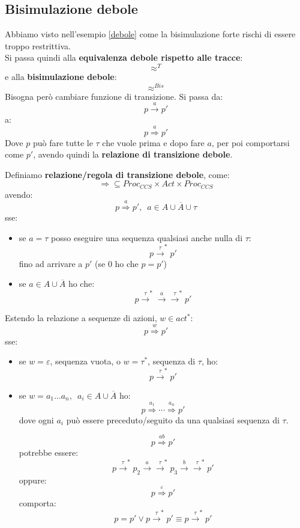 \documentclass[a4paper,12pt, oneside]{book}
\begin{document}
\subsection{Bisimulazione debole}
Abbiamo visto nell'esempio \ref{debole} come la bisimulazione forte rischi di
essere troppo restrittiva.\\
Si passa quindi alla \textbf{equivalenza debole rispetto alle tracce}:
\[\approx^{T}\]
e alla \textbf{bisimulazione debole}:
\[\approx^{Bis}\]
Bisogna però cambiare funzione di transizione. Si passa da:
\[p\stackrel{a}{\rightarrow}p'\]
a:
\[p\stackrel{a}{\Rightarrow}p'\]
Dove $p$ può fare tutte le $\tau$ che vuole prima e dopo fare $a$, per poi
comportarsi come $p'$, avendo quindi la \textbf{relazione di transizione debole}.
\begin{definizione}
  Definiamo \textbf{relazione/regola di transizione debole}, come:
  \[\Rightarrow\subseteq Proc_{CCS}\times Act\times Proc_{CCS}\]
  avendo:
  \[p\stackrel{a}{\Rightarrow}p',\,\,\,a\in A\cup \overline{A}\cup \tau\]
  sse:
  \begin{itemize}
    \item se $a=\tau$ posso eseguire una sequenza qualsiasi anche nulla di
    $\tau$:
    \[p\stackrel{\tau}{\rightarrow}^*p'\]
    fino ad arrivare a $p'$ (se 0 ho che $p=p'$)
    \item se $a\in A\cup\overline{A}$ ho che:
    \[p\stackrel{\tau}{\rightarrow}^*
      \stackrel{a}{\rightarrow}\stackrel{\tau}{\rightarrow}^*p'\]
  \end{itemize}
  Estendo la relazione a sequenze di azioni, $w\in act^*$:
  \[p\stackrel{w}{\Rightarrow}p'\]
  sse:
  \begin{itemize}
    \item se $w=\varepsilon$, sequenza vuota, o $w=\tau^*$, sequenza di $\tau$,
    ho: 
    \[p\stackrel{\tau}{\rightarrow}^*p'\]
    
    \item se $w=a_1\ldots a_n,\,\,\,a_i\in A\cup \overline{A}$ ho:
    \[p\stackrel{a_1}{\Rightarrow}\cdots \stackrel{a_n}{\Rightarrow}p'\]
    dove ogni $a_i$ può essere preceduto/seguito da una qualsiasi sequenza di
    $\tau$.
    \begin{esempio}
      \[p\stackrel{ab}{\Rightarrow}p'\]
      potrebbe essere:
      \[p\stackrel{\tau}{\rightarrow}^*p_2\stackrel{a}{\rightarrow}
        \stackrel{\tau}{\rightarrow}^*p_3\stackrel{b}{\rightarrow}
        \stackrel{\tau}{\rightarrow}^*p'\]
      oppure:
      \[p\stackrel{\varepsilon}{\Rightarrow}p'\]
      comporta:
      \[p=p'\lor p \stackrel{\tau}{\rightarrow}^*p'\equiv
        p\stackrel{\tau}{\rightarrow}^*p'\] 
    \end{esempio}
  \end{itemize}
  
\end{definizione}
\end{document}
